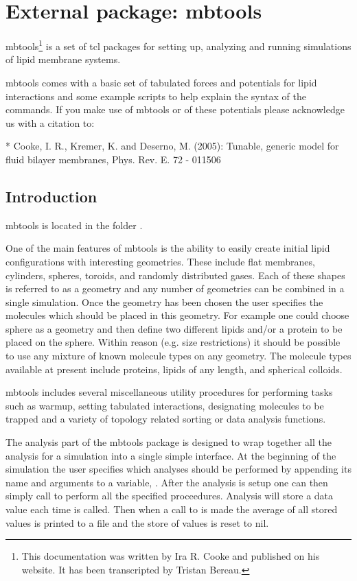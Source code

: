 \chapter{External package: mbtools}
\label{chap:mbtools}


mbtools\footnote{This documentation was written by Ira R. Cooke and published on his website. It has been transcripted by Tristan Bereau.} is a set of tcl packages for setting up, analyzing and running simulations of lipid membrane systems.

 mbtools comes with a basic set of tabulated forces and potentials for lipid interactions and some example scripts to help explain the syntax of the commands. If you make use of mbtools or of these potentials please acknowledge us with a citation to:

    * Cooke, I. R., Kremer, K. and Deserno, M. (2005): Tunable, generic model for fluid bilayer membranes, Phys. Rev. E. 72 - 011506

\section{Introduction}

mbtools is located in the folder .

One of the main features of mbtools is the ability to easily create initial lipid configurations with interesting geometries. These include flat membranes, cylinders, spheres, toroids, and randomly distributed gases. Each of these shapes is referred to as a geometry and any number of geometries can be combined in a single simulation. Once the geometry has been chosen the user specifies the molecules which should be placed in this geometry. For example one could choose sphere as a geometry and then define two different lipids and/or a protein to be placed on the sphere. Within reason (e.g. size restrictions) it should be possible to use any mixture of known molecule types on any geometry. The molecule types available at present include proteins, lipids of any length, and spherical colloids.

mbtools includes several miscellaneous utility procedures for performing tasks such as warmup, setting tabulated interactions, designating molecules to be trapped and a variety of topology related sorting or data analysis functions.

The analysis part of the mbtools package is designed to wrap together all the analysis for a simulation into a single simple interface. At the beginning of the simulation the user specifies which analyses should be performed by appending its name and arguments to a variable, . After the analysis is setup one can then simply call  to perform all the specified proceedures. Analysis will store a data value each time  is called. Then when a call to  is made the average of all stored values is printed to a file and the store of values is reset to nil.

